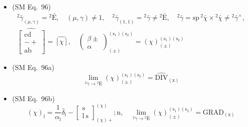\documentclass[12pt]{article}
\begin{document}
\begin{itemize}[label={},leftmargin=0pt]
    \item (SM Eq.\ 96) 
    \[
    \begin{gathered}
    {}^2\bar{\gamma}_{(\mu,\gamma)} = {}^2\bar{\mathrm{E}}, \quad (\mu, \gamma) \ne 1, \quad {}^2\bar{\gamma}_{(1,1)} = {}^2\bar{\gamma} \ne {}^2\bar{\mathrm{E}}, \quad {}^2\bar{\gamma} = \mathrm{sp}\,{}^2\bar{\chi} \times {}^2\bar{\chi} \ne {}^2\bar{\gamma}^\times, \\
    \widehat{\left[ \begin{smallmatrix} \mathrm{cd} \\ - + \\ \mathrm{ab} \end{smallmatrix} \right]} = \widehat{[\chi]}, \quad \left( \begin{smallmatrix} \beta \pm \\ \alpha \end{smallmatrix} \right)^{(\mathrm{s}_1)(\mathrm{s}_2)}_{(\pm)} = (\chi)^{(\mathrm{s}_1)(\mathrm{s}_2)}_{(\pm)}
    \end{gathered}
    \]

    \item (SM Eq.\ 96a) 
    \[
    \lim_{{}^2\bar{\gamma} \to {}^2\bar{\mathrm{E}}} (\chi)^{(\mathrm{s}_1)(\mathrm{s}_2)}_{(\pm)} = \widehat{\mathrm{DIV}}_{(\mathrm{x})}
    \]

    \item (SM Eq.\ 96b) 
    \[
    (\chi)_\mathrm{l} = \frac{1}{\alpha_\mathrm{l}}\bar{\delta}_\mathrm{l} - \left[ \begin{smallmatrix} \mathrm{s} \\ \mathrm{l}\ \mathrm{s} \end{smallmatrix} \right]^{(\chi)}_{(\chi)+};\mathrm{n}, \quad \lim_{{}^2\bar{\gamma} \to {}^2\bar{\mathrm{E}}} (\chi)^{(\mathrm{s}_1)(\mathrm{s}_2)}_{(\pm)} = \mathrm{GRAD}_{(\mathrm{x})}
    \]


\end{itemize}
\end{document}
